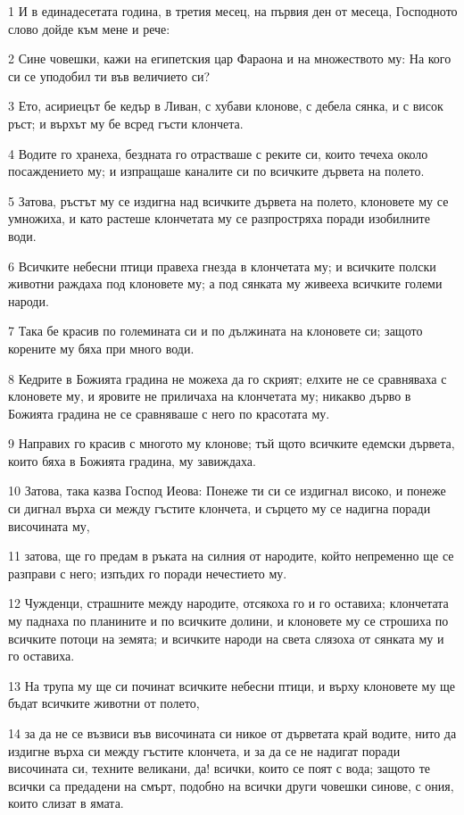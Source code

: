 \par 1 И в единадесетата година, в третия месец, на първия ден от месеца, Господното слово дойде към мене и рече:
\par 2 Сине човешки, кажи на египетския цар Фараона и на множеството му: На кого си се уподобил ти във величието си?
\par 3 Ето, асириецът бе кедър в Ливан, с хубави клонове, с дебела сянка, и с висок ръст; и върхът му бе всред гъсти клончета.
\par 4 Водите го хранеха, бездната го отрастваше с реките си, които течеха около посаждението му; и изпращаше каналите си по всичките дървета на полето.
\par 5 Затова, ръстът му се издигна над всичките дървета на полето, клоновете му се умножиха, и като растеше клончетата му се разпростряха поради изобилните води.
\par 6 Всичките небесни птици правеха гнезда в клончетата му; и всичките полски животни раждаха под клоновете му; а под сянката му живееха всичките големи народи.
\par 7 Така бе красив по големината си и по дължината на клоновете си; защото корените му бяха при много води.
\par 8 Кедрите в Божията градина не можеха да го скрият; елхите не се сравняваха с клоновете му, и яровите не приличаха на клончетата му; никакво дърво в Божията градина не се сравняваше с него по красотата му.
\par 9 Направих го красив с многото му клонове; тъй щото всичките едемски дървета, които бяха в Божията градина, му завиждаха.
\par 10 Затова, така казва Господ Иеова: Понеже ти си се издигнал високо, и понеже си дигнал върха си между гъстите клончета, и сърцето му се надигна поради височината му,
\par 11 затова, ще го предам в ръката на силния от народите, който непременно ще се разправи с него; изпъдих го поради нечестието му.
\par 12 Чужденци, страшните между народите, отсякоха го и го оставиха; клончетата му паднаха по планините и по всичките долини, и клоновете му се строшиха по всичките потоци на земята; и всичките народи на света слязоха от сянката му и го оставиха.
\par 13 На трупа му ще си починат всичките небесни птици, и върху клоновете му ще бъдат всичките животни от полето,
\par 14 за да не се възвиси във височината си никое от дърветата край водите, нито да издигне върха си между гъстите клончета, и за да се не надигат поради височината си, техните великани, да! всички, които се поят с вода; защото те всички са предадени на смърт, подобно на всички други човешки синове, с ония, които слизат в ямата.
